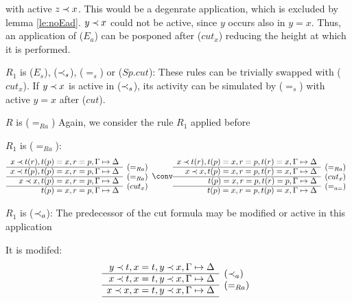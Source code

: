 \begin{PROOF}
\begin{LS}
\begin{LSA}
with active $z\mathbin{\prec} x$. This would be a degenrate application, which is
excluded by lemma \ref{le:noEad}. $y\mathbin{\prec} x$ could not be active, since $y$
occurs also in $y=x$. Thus, an application of ($E_a$) can be posponed after
($cut_x$) reducing the height at which it is performed.
\item $R_1$ is ($E_s$), ($\mathbin{\prec}_s$), ($=_s$) or ($Sp.cut$): These rules can
be trivially swapped with ($cut_x$). If $y\mathbin{\prec} x$ is active in ($\mathbin{\prec}_s$),
its activity can be simulated by ($=_s$) with active $y=x$ after ($cut$).
\end{LSA}
%
\item $R$ is ($=_{Ra}$)
Again, we consider the rule $R_1$ applied before
\begin{LSA}
\item $R_1$ is ($=_{Ra}$):
{\scriptsize \[ \begin{array}{rl}
x\Incl t(r), t(p)=x, r=p,\GSD  \\ \cline{1-1}
x\Incl t(p), t(p)=x, r=p, \GSD & \rabove{(=_{Ra})} \\ \cline{1-1}
x\Incl x,  t(p)=x, r=p, \GSD & \rabove{(=_{Ra})} \\ \cline{1-1}
           t(p)=x, r=p,\GSD & \rabove{(cut_x)} \end{array}  \conv 
 \begin{array}{rl}
x\Incl t(r), t(p)=x, r=p, t(r)=x,\GSD  \\ \cline{1-1}
x\Incl x, t(p)=x, r=p, t(r)=x,\GSD & \rabove{(=_{Ra})} \\ \cline{1-1}
   t(p)=x, r=p, t(r)=p,\GSD & \rabove{(cut_x)} \\ \cline{1-1}
           t(p)=x, r=p, t(p)=x, \GSD & \rabove{(=_{a=})} \end{array} \] }
\item $R_1$ is ($\mathbin{\prec}_a$):
The predecessor of the cut formula may be modified or active in this application
\begin{LSB}
 \item\label{it:modIncl} It is modifed:
 \[ \begin{array}{rl}
 y\Incl t, x=t, y\Incl x, \GSD \\ \cline{1-1}
 x\Incl t, x=t, y\Incl x, \GSD & \rabove{(\Incl_a)} \\ \cline{1-1}
 x\Incl x, x=t, y\Incl x, \GSD & \rabove{(=_{Ra})} \\ \cline{1-1}

\end{array}\]
\end{LSB}
\end{LSA}
\end{LS}
\end{PROOF}
